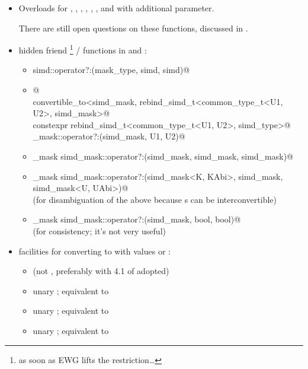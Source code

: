\begin{itemize}
  \item Overloads for ,
    ,
    ,
    , ,
    , and  with additional  parameter.

    There are still open questions on these functions, discussed in .

  \item hidden friend \footnote{as soon as EWG lifts the
    restriction\ldots} /  functions in 
    and :
    \begin{itemize}
      \item \lstinline@simd simd::operator?:(mask_type, simd, simd)@
      \item {}@\\
        \lstinline@requires convertible_to<simd_mask, rebind_simd_t<common_type_t<U1, U2>, simd_mask>@\\
        \lstinline@friend constexpr rebind_simd_t<common_type_t<U1, U2>, simd_type>@\\
        \lstinline@simd_mask::operator?:(simd_mask, U1, U2)@
      \item \lstinline@simd_mask simd_mask::operator?:(simd_mask, simd_mask, simd_mask)@
      \item \lstinline@simd_mask simd_mask::operator?:(simd_mask<K, KAbi>, simd_mask, simd_mask<U, UAbi>)@\\
        (for disambiguation of the above because s can be interconvertible)
      \item \lstinline@simd_mask simd_mask::operator?:(simd_mask, bool, bool)@\\
        (for consistency; it's not very useful)
    \end{itemize}

  \item facilities for converting  to  with
    values  or :
    \begin{itemize}
      \item {} (not ,
        preferably with 4.1 of \cite{P2600R0} adopted)
      \item unary ; equivalent to 
      \item unary ; equivalent to 
      \item unary ; equivalent to 
    \end{itemize}
\end{itemize}


